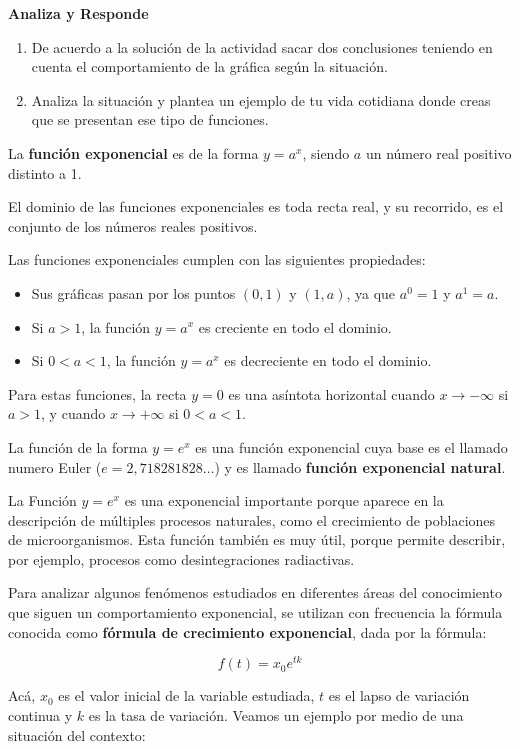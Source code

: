 \documentclass[12pt,a4paper]{article}
\begin{document}
\textbf{Analiza y Responde}

\begin{enumerate}
\item De acuerdo a la solución de la actividad sacar dos conclusiones teniendo en cuenta el comportamiento de la gráfica según la situación.
\item Analiza la situación y plantea un ejemplo de tu vida cotidiana donde creas que se presentan ese tipo de funciones.
\end{enumerate}

\vspace{5mm}


\begin{tcolorbox}[colback=fondorosa,colframe=rojoclaro,title=\textbf{Mini explicación - Función Exponencial},breakable]

La \textbf{función exponencial} es de la forma $y = a^x$, siendo $a$ un número real positivo distinto a 1.

El dominio de las funciones exponenciales es toda recta real, y su recorrido, es el conjunto de los números reales positivos.

Las funciones exponenciales cumplen con las siguientes propiedades:

\begin{itemize}
\item Sus gráficas pasan por los puntos $(0,1)$ y $(1,a)$, ya que $a^0 = 1$ y $a^1 = a$.
\item Si $a > 1$, la función $y = a^x$ es creciente en todo el dominio.
\item Si $0 < a < 1$, la función $y = a^x$ es decreciente en todo el dominio.
\end{itemize}

Para estas funciones, la recta $y = 0$ es una asíntota horizontal cuando $x \to -\infty$ si $a > 1$, y cuando $x \to +\infty$ si $0 < a < 1$.

La función de la forma $y = e^x$ es una función exponencial cuya base es el llamado numero Euler ($e = 2,718281828\ldots$) y es llamado \textbf{función exponencial natural}.

La Función $y = e^x$ es una exponencial importante porque aparece en la descripción de múltiples procesos naturales, como el crecimiento de poblaciones de microorganismos. Esta función también es muy útil, porque permite describir, por ejemplo, procesos como desintegraciones radiactivas.

Para analizar algunos fenómenos estudiados en diferentes áreas del conocimiento que siguen un comportamiento exponencial, se utilizan con frecuencia la fórmula conocida como \textbf{fórmula de crecimiento exponencial}, dada por la fórmula:

$$f(t) = x_0 e^{tk}$$

Acá, $x_0$ es el valor inicial de la variable estudiada, $t$ es el lapso de variación continua y $k$ es la tasa de variación. Veamos un ejemplo por medio de una situación del contexto:

\end{tcolorbox}
\end{document}
